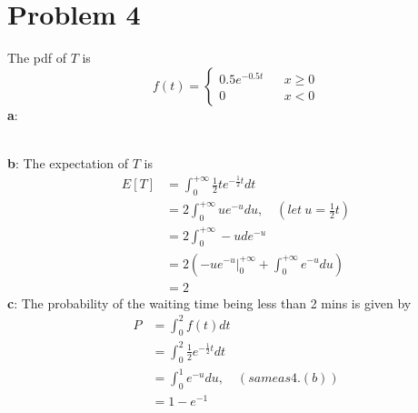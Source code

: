 \documentclass[12pt,letterpaper]{article}
\begin{document}
\section*{Problem 4}
    The pdf of $T$ is
        \begin{equation*}
            f(t) = \left\{
                \begin{aligned}
                    0.5 e^{-0.5t} & & x \geq 0 \\
                    0 & & x < 0
                \end{aligned}
            \right.
        \end{equation*}
    \textbf{a}: \\
         \\
    \textbf{b}: The expectation of $T$ is
        \begin{equation*}
            \begin{aligned}
                E[T] &= \int_{0}^{+\infty} \frac{1}{2} te^{-\frac{1}{2}t} dt \\
                &= 2\int_{0}^{+\infty} ue^{-u} du,\quad (let\ u = \frac{1}{2} t) \\
                &= 2\int_{0}^{+\infty} -u de^{-u} \\
                &= 2(-ue^{-u}|_{0}^{+\infty} + \int_{0}^{+\infty}e^{-u}du) \\
                &= 2
            \end{aligned}
        \end{equation*}
    \textbf{c}: The probability of the waiting time being less than 2 mins is given by
        \begin{equation*}
            \begin{aligned}
                P &= \int_{0}^{2} f(t)dt \\
                &= \int_{0}^{2} \frac{1}{2} e^{-\frac{1}{2}t} dt \\
                &= \int_{0}^{1}e^{-u}du,\quad (same as 4.(b)) \\
                &= 1 - e^{-1} \\
            \end{aligned}
        \end{equation*}
\end{document}
